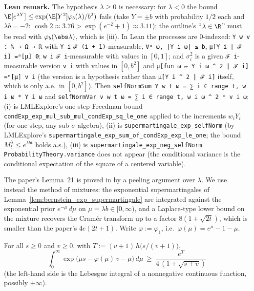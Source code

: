 \textbf{Lean remark.} The hypothesis $\lambda \ge 0$ is necessary: for $\lambda < 0$ the bound
$\E[e^{\lambda Y}] \le \exp(\E[Y^2]\varphi_b(\lambda)/b^2)$ fails (take $Y = \pm b$ with probability
$1/2$ each and $\lambda b = -2$: $\cosh 2 \approx 3.76 > \exp(e^{-2} + 1) \approx 3.11$); the
outline's ``$\lambda \in \R$'' must be read with $\varphi_b(\abs\lambda)$, which is (iii). In Lean
the processes are $0$-indexed: \texttt{Y w v : ℕ → Ω → ℝ} with \texttt{Y i}
\texttt{ℱ (i + 1)}-measurable, \texttt{∀ᵐ ω, |Y i ω| ≤ b}, \texttt{μ[Y i | ℱ i] =ᵐ[μ] 0};
\texttt{w i} \texttt{ℱ i}-measurable with values in $[0, 1]$; and $\sigma_i^2$ is a given
\texttt{ℱ i}-measurable version \texttt{v i} with values in $[0, b^2]$ and
\texttt{μ[fun ω ↦ Y i ω \^{} 2 | ℱ i] =ᵐ[μ] v i} (the version is a hypothesis rather than
\texttt{μ[Y i \^{} 2 | ℱ i]} itself, which is only a.e.\ in $[0, b^2]$). Then
\texttt{selfNormSum Y w t ω = ∑ i ∈ range t, w i ω * Y i ω} and
\texttt{selfNormVar v w t ω = ∑ i ∈ range t, w i ω \^{} 2 * v i ω}; (i) is
LMLExplore's one-step Freedman bound \texttt{condExp\_exp\_mul\_sub\_mul\_condExp\_sq\_le\_one}
applied to the increments $w_i Y_i$ (for one step, any sub-$\sigma$-algebra), (ii) is
\texttt{supermartingale\_exp\_selfNorm} (by LMLExplore's
\texttt{supermartingale\_exp\_sum\_of\_condExp\_exp\_le\_one};
the bound $M^\lambda_t \le e^{\lambda b t}$ holds a.s.), (iii) is
\texttt{supermartingale\_exp\_neg\_selfNorm}. \texttt{ProbabilityTheory.variance} does not appear
(the conditional variance is the conditional expectation of the square of a centered variable).

The paper's Lemma~21 is proved in \cite{menard2021fast} by a peeling argument over
$\lambda$. We use instead the method of mixtures: the exponential supermartingales of
Lemma~\ref{lem:bernstein_exp_supermartingale} are integrated against the exponential prior
$e^{-\mu}\,d\mu$ on $\mu = \lambda b \in [0, \infty)$, and a Laplace-type lower bound on the
mixture recovers the Cramér transform up to a factor $8(1 + \sqrt{2t})$, which is smaller than the
paper's $4e(2t + 1)$. Write $\varphi := \varphi_1$, i.e.\ $\varphi(\mu) = e^\mu - 1 - \mu$.

\begin{lemma}\label{lem:pconc_mixture_lower}
\leanok
For all $s \ge 0$ and $v \ge 0$, with $T := (v + 1)\, h\big(s/(v + 1)\big)$,
\[
  \int_0^\infty \exp\big(\mu s - \varphi(\mu)\, v - \mu\big)\, d\mu \ \ge\ \frac{e^{T}}{4\,(1 + \sqrt{s + v})}
\]
(the left-hand side is the Lebesgue integral of a nonnegative continuous function, possibly $+\infty$).
\end{lemma}

